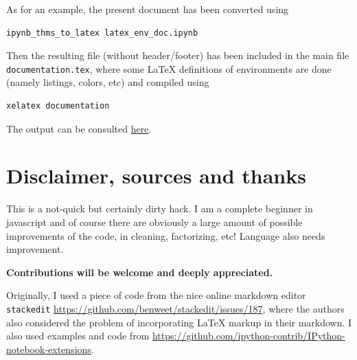 \begin{example}
As for an example, the present document has been converted using

\begin{verbatim}
ipynb_thms_to_latex latex_env_doc.ipynb
\end{verbatim}

Then the resulting file (without header/footer) has been included in the
main file \texttt{documentation.tex}, where some LaTeX definitions of
environments are done (namely listings, colors, etc) and compiled using

\begin{verbatim}
xelatex documentation
\end{verbatim}

The output can be consulted \href{documentation.pdf}{here}.
\end{example}

    \section{Disclaimer, sources and
thanks}\label{disclaimer-sources-and-thanks}

    This is a not-quick but certainly dirty hack. I am a complete beginner
in javascript and of course there are obviously a large amount of
possible improvements of the code, in cleaning, factorizing, etc!
Language also needs improvement.

\textbf{Contributions will be welcome and deeply appreciated.}

Originally, I used a piece of code from the nice online markdown editor
\texttt{stackedit}
\url{https://github.com/benweet/stackedit/issues/187}, where the authors
also considered the problem of incorporating LaTeX markup in their
markdown. I also used examples and code from
\url{https://github.com/ipython-contrib/IPython-notebook-extensions}.


    
    
%
%

    
    